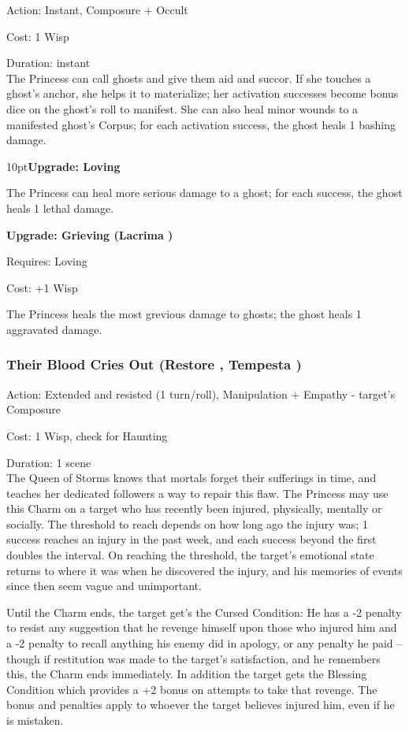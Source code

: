 \noindent Action: Instant, Composure + Occult

\noindent Cost: 1 Wisp

\noindent Duration: instant \\

\noindent The Princess can call ghosts and give them aid and succor. If she touches a ghost's anchor, she helps it to materialize; her activation successes become bonus dice on the ghost's roll to manifest. She can also heal minor wounds to a manifested ghost's Corpus; for each activation success, the ghost heals 1 bashing damage.
\begin{myindentpar}{10pt}\textbf{Upgrade: Loving}

The Princess can heal more serious damage to a ghost; for each success, the ghost heals 1 lethal damage.

\textbf{Upgrade: Grieving (Lacrima \textbullet\textbullet)}

\noindent Requires: Loving

\noindent Cost: +1 Wisp

The Princess heals the most grevious damage to ghosts; the ghost heals 1 aggravated damage.\end{myindentpar}

\subsubsection*{Their Blood Cries Out (Restore \textbullet\textbullet, Tempesta \textbullet\textbullet\textbullet)}

\noindent Action: Extended and resisted (1 turn/roll), Manipulation + Empathy - target's Composure

\noindent Cost: 1 Wisp, check for Haunting
 
\noindent Duration: 1 scene \\

\noindent The Queen of Storms knows that mortals forget their sufferings in time, and teaches her dedicated followers a way to repair this flaw. The Princess may use this Charm on a target who has recently been injured, physically, mentally or socially. The threshold to reach depends on how long ago the injury was; 1 success reaches an injury in the past week, and each success beyond the first doubles the interval. On reaching the threshold, the target's emotional state returns to where it was when he discovered the injury, and his memories of events since then seem vague and unimportant.

Until the Charm ends, the target get's the Cursed Condition: He has a -2 penalty to resist any suggestion that he revenge himself upon those who injured him and a -2 penalty to recall anything his enemy did in apology, or any penalty he paid -- though if restitution was made to the target's satisfaction, and he remembers this, the Charm ends immediately. In addition the target gets the Blessing Condition which provides a +2 bonus on attempts to take that revenge. The bonus and penalties apply to whoever the target believes injured him, even if he is mistaken.

